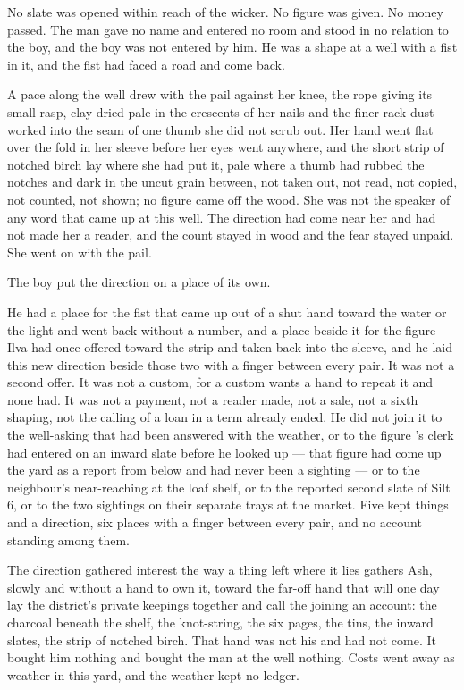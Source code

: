 No slate was opened within reach of the wicker. No figure was given. No money passed. The man gave no name and entered no room and stood in no relation to the boy, and the boy was not entered by him. He was a shape at a well with a fist in it, and the fist had faced a road and come back.

A pace along the well  drew with the pail against her knee, the rope giving its small rasp, clay dried pale in the crescents of her nails and the finer rack dust worked into the seam of one thumb she did not scrub out. Her hand went flat over the fold in her sleeve before her eyes went anywhere, and the short strip of notched birch lay where she had put it, pale where a thumb had rubbed the notches and dark in the uncut grain between, not taken out, not read, not copied, not counted, not shown; no figure came off the wood. She was not the speaker of any word that came up at this well. The direction had come near her and had not made her a reader, and the count stayed in wood and the fear stayed unpaid. She went on with the pail.

\scenebreak

The boy put the direction on a place of its own.

He had a place for the fist that came up out of a shut hand toward the water or the light and went back without a number, and a place beside it for the figure Ilva had once offered toward the strip and taken back into the sleeve, and he laid this new direction beside those two with a finger between every pair. It was not a second offer. It was not a custom, for a custom wants a hand to repeat it and none had. It was not a payment, not a reader made, not a sale, not a sixth shaping, not the calling of a loan in a term already ended. He did not join it to the well-asking that had been answered with the weather, or to the figure 's clerk had entered on an inward slate before he looked up --- that figure had come up the yard as a report from  below  and had never been a sighting --- or to the neighbour's near-reaching at the loaf shelf, or to the reported second slate of Silt 6, or to the two sightings on their separate trays at the market. Five kept things and a direction, six places with a finger between every pair, and no account standing among them.

The direction gathered interest the way a thing left where it lies gathers Ash, slowly and without a hand to own it, toward the far-off hand that will one day lay the district's private keepings together and call the joining an account: the charcoal beneath the shelf, the knot-string, the six pages, the tins, the inward slates, the strip of notched birch. That hand was not his and had not come. It bought him nothing and bought the man at the well nothing. Costs went away as weather in this yard, and the weather kept no ledger.

